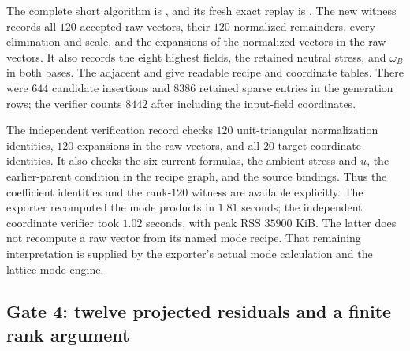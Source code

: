 The complete short algorithm is
, and its fresh
exact replay is
.
The new witness
records all $120$ accepted raw vectors, their $120$ normalized
remainders, every elimination and scale, and the expansions of
the normalized vectors in the raw vectors.  It also records the
eight highest fields, the retained neutral stress, and $\omega_B$
in both bases.  The adjacent
 and
give readable recipe and coordinate tables.  There were $644$
candidate insertions and $8386$ retained sparse entries in the
generation rows; the verifier counts $8442$ after including the
input-field coordinates.

The independent verification record
checks $120$ unit-triangular normalization identities, $120$
expansions in the raw vectors, and all $20$ target-coordinate
identities.  It also checks the six current formulas, the ambient
stress and $u$, the earlier-parent condition in the recipe graph,
and the source bindings.  Thus the coefficient identities and
the rank-$120$ witness are available explicitly.  The exporter
recomputed the mode products in $1.81$ seconds; the independent
coordinate verifier took $1.02$ seconds, with peak RSS $35900$ KiB.
The latter does not recompute a raw vector from its named mode
recipe.  That remaining interpretation is supplied by the
exporter's actual mode calculation and the lattice-mode engine.

\subsection{Gate 4: twelve projected residuals and a finite rank argument}

